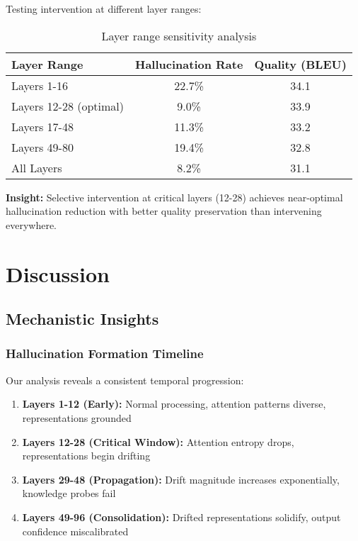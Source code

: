 \documentclass[11pt]{article}
\begin{document}
Testing intervention at different layer ranges:

\begin{table}[H]
\centering
\begin{tabular}{@{}lcc@{}}
\toprule
\textbf{Layer Range} & \textbf{Hallucination Rate} & \textbf{Quality (BLEU)} \\ \midrule
Layers 1-16 & 22.7\% & 34.1 \\
Layers 12-28 (optimal) & 9.0\% & 33.9 \\
Layers 17-48 & 11.3\% & 33.2 \\
Layers 49-80 & 19.4\% & 32.8 \\
All Layers & 8.2\% & 31.1 \\ \bottomrule
\end{tabular}
\caption{Layer range sensitivity analysis}
\end{table}

\textbf{Insight:} Selective intervention at critical layers (12-28) achieves near-optimal hallucination reduction with better quality preservation than intervening everywhere.

\section{Discussion}

\subsection{Mechanistic Insights}

\subsubsection{Hallucination Formation Timeline}

Our analysis reveals a consistent temporal progression:

\begin{enumerate}
    \item \textbf{Layers 1-12 (Early):} Normal processing, attention patterns diverse, representations grounded
    \item \textbf{Layers 12-28 (Critical Window):} Attention entropy drops, representations begin drifting
    \item \textbf{Layers 29-48 (Propagation):} Drift magnitude increases exponentially, knowledge probes fail
    \item \textbf{Layers 49-96 (Consolidation):} Drifted representations solidify, output confidence miscalibrated
\end{enumerate}
\end{document}
